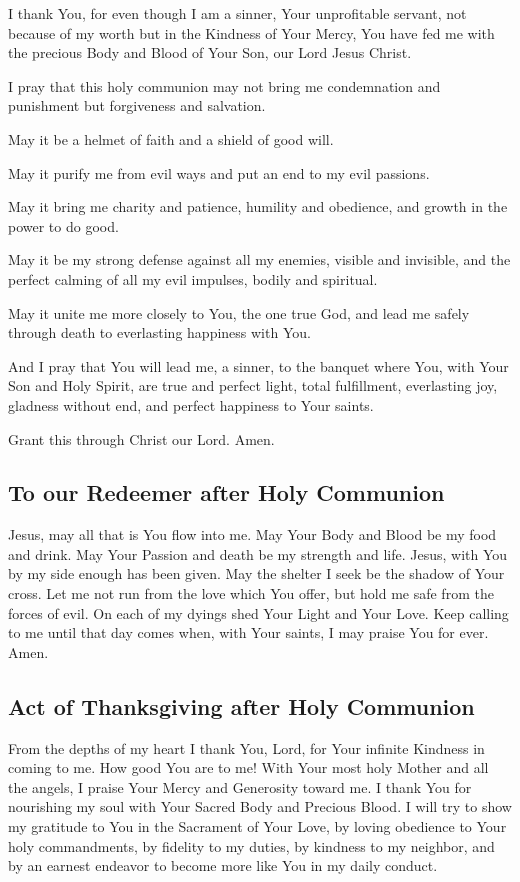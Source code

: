 \documentclass[12pt]{article}
\newcommand{\prayertitle}[1]{\subsection{#1}}
\begin{document}
I thank You, for even though I am a sinner, Your unprofitable servant, not because of my worth but in the Kindness of Your Mercy, You have fed me with the precious Body and Blood of Your Son, our Lord Jesus Christ.

I pray that this holy communion may not bring me condemnation and punishment but forgiveness and salvation.

May it be a helmet of faith and a shield of good will.

May it purify me from evil ways and put an end to my evil passions.

May it bring me charity and patience, humility and obedience, and growth in the power to do good.

May it be my strong defense against all my enemies, visible and invisible, and the perfect calming of all my evil impulses, bodily and spiritual.

May it unite me more closely to You, the one true God, and lead me safely through death to everlasting happiness with You.

And I pray that You will lead me, a sinner, to the banquet where You, with Your Son and Holy Spirit, are true and perfect light, total fulfillment, everlasting joy, gladness without end, and perfect happiness to Your saints.

Grant this through Christ our Lord. Amen.

\prayertitle{To our Redeemer after Holy Communion}
Jesus, may all that is You flow into me.
May Your Body and Blood be my food and drink.
May Your Passion and death be my strength and life.
Jesus, with You by my side enough has been given.
May the shelter I seek be the shadow of Your cross.
Let me not run from the love which You offer, but hold me safe from the forces of evil.
On each of my dyings shed Your Light and Your Love.
Keep calling to me until that day comes when, with Your saints, I may praise You for ever.
Amen.

\prayertitle{Act of Thanksgiving after Holy Communion}
From the depths of my heart I thank You, Lord, for Your infinite Kindness in coming to me.
How good You are to me!
With Your most holy Mother and all the angels, I praise Your Mercy and Generosity toward me.
I thank You for nourishing my soul with Your Sacred Body and Precious Blood.
I will try to show my gratitude to You in the Sacrament of Your Love, by loving obedience to Your holy commandments, by fidelity to my duties, by kindness to my neighbor, and by an earnest endeavor to become more like You in my daily conduct.
\end{document}
